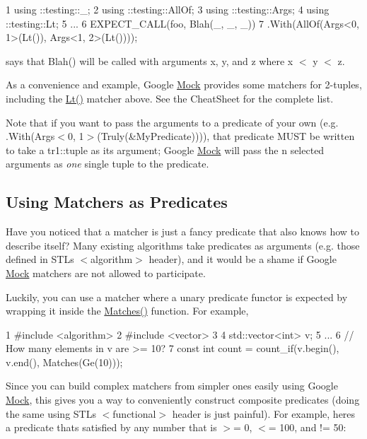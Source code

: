 \begin{DoxyCode}
1 using ::testing::\_;
2 using ::testing::AllOf;
3 using ::testing::Args;
4 using ::testing::Lt;
5 ...
6   EXPECT\_CALL(foo, Blah(\_, \_, \_))
7       .With(AllOf(Args<0, 1>(Lt()), Args<1, 2>(Lt())));
\end{DoxyCode}


says that {\ttfamily Blah()} will be called with arguments {\ttfamily x}, {\ttfamily y}, and {\ttfamily z} where {\ttfamily x $<$ y $<$ z}.

As a convenience and example, Google \hyperlink{class_mock}{Mock} provides some matchers for 2-\/tuples, including the {\ttfamily \hyperlink{namespacetesting_ad621459957a8bcdd3c256b7940ecbf99}{Lt()}} matcher above. See the Cheat\+Sheet for the complete list.

Note that if you want to pass the arguments to a predicate of your own (e.\+g. {\ttfamily .With(Args$<$0, 1$>$(Truly(\&\+My\+Predicate)))}), that predicate M\+U\+ST be written to take a {\ttfamily tr1\+::tuple} as its argument; Google \hyperlink{class_mock}{Mock} will pass the {\ttfamily n} selected arguments as {\itshape one} single tuple to the predicate.

\subsection*{Using Matchers as Predicates}

Have you noticed that a matcher is just a fancy predicate that also knows how to describe itself? Many existing algorithms take predicates as arguments (e.\+g. those defined in S\+TL\textquotesingle{}s {\ttfamily $<$algorithm$>$} header), and it would be a shame if Google \hyperlink{class_mock}{Mock} matchers are not allowed to participate.

Luckily, you can use a matcher where a unary predicate functor is expected by wrapping it inside the {\ttfamily \hyperlink{namespacetesting_ad53b509ae9cd51040d67f668f99702ae}{Matches()}} function. For example,


\begin{DoxyCode}
1 #include <algorithm>
2 #include <vector>
3 
4 std::vector<int> v;
5 ...
6 // How many elements in v are >= 10?
7 const int count = count\_if(v.begin(), v.end(), Matches(Ge(10)));
\end{DoxyCode}


Since you can build complex matchers from simpler ones easily using Google \hyperlink{class_mock}{Mock}, this gives you a way to conveniently construct composite predicates (doing the same using S\+TL\textquotesingle{}s {\ttfamily $<$functional$>$} header is just painful). For example, here\textquotesingle{}s a predicate that\textquotesingle{}s satisfied by any number that is $>$= 0, $<$= 100, and != 50\+:


